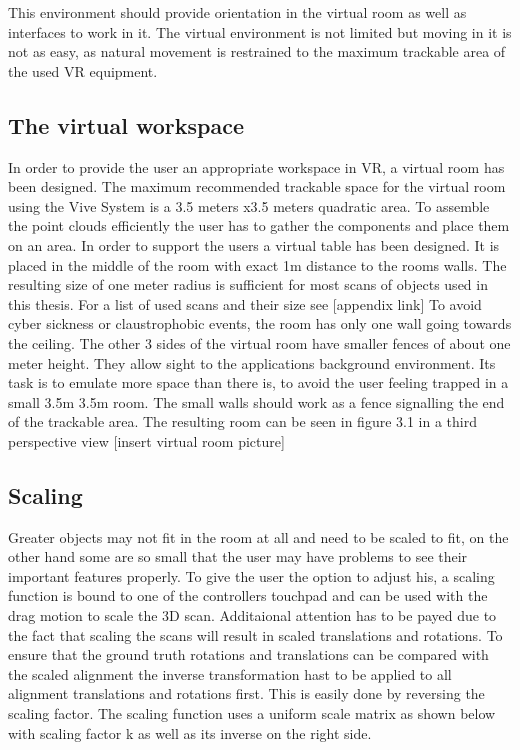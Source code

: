 \documentclass[hyperref,english,bachelorofscience,bibnum]{cgvpub}
\begin{document}
This environment should provide orientation in the virtual room as well as interfaces to work in it. The virtual environment is not limited but moving in it is not as easy, as natural movement is restrained to the maximum trackable area of the used VR equipment. 

\subsection{The virtual workspace}

In order to provide the user an appropriate workspace in VR, a virtual room has been designed. The maximum recommended trackable space for the virtual room using the Vive System is a 3.5 meters x3.5 meters quadratic area.\cite{vivehelp}
To assemble the point clouds efficiently the user has to gather the components and place them on an area. In order to support the users a virtual table has been designed. It is placed in the middle of the room with exact 1m distance to the rooms walls. The resulting size of one meter radius is sufficient for most scans of objects used in this thesis. For a list of used scans and their size see [appendix link]
To avoid cyber sickness or claustrophobic events, the room has only one wall going towards the ceiling. The other 3 sides of the virtual room have smaller fences of about one meter height. They allow sight to the applications background environment. Its task is to emulate more space than there is, to avoid the user feeling trapped in a small 3.5m 3.5m room. The small walls should work as a fence signalling the end of the trackable area. The resulting room can be seen in figure 3.1 in a third perspective view [insert virtual room picture]
 
\subsection{Scaling}

Greater objects may not fit in the room at all and need to be scaled to fit, on the other hand some are so small that the user may have problems to see their important features properly. To give the user the option to adjust his, a scaling function is bound to one of the controllers touchpad and can be used with the drag motion to scale the 3D scan. Additaional attention has to be payed due to the fact that scaling the scans will result in scaled translations and rotations. To ensure that the ground truth rotations and translations can be compared with the scaled alignment the inverse transformation hast to be applied to all alignment translations and rotations first. This is easily done by reversing the scaling factor. The scaling function uses a uniform scale matrix as shown below with scaling factor k as well as its inverse on the right side.
\end{document}
